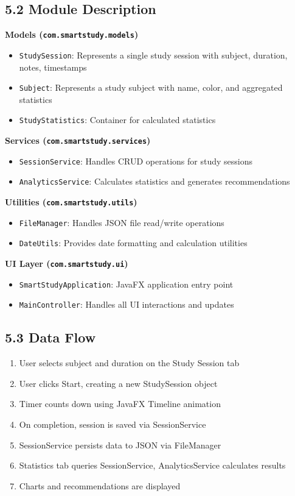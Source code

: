 \documentclass[12pt,a4paper]{article}
\begin{document}
\subsection{5.2 Module Description}

\textbf{Models (\texttt{com.smartstudy.models})}
\begin{itemize}
    \item \texttt{StudySession}: Represents a single study session with subject, duration, notes, timestamps
    \item \texttt{Subject}: Represents a study subject with name, color, and aggregated statistics
    \item \texttt{StudyStatistics}: Container for calculated statistics
\end{itemize}

\textbf{Services (\texttt{com.smartstudy.services})}
\begin{itemize}
    \item \texttt{SessionService}: Handles CRUD operations for study sessions
    \item \texttt{AnalyticsService}: Calculates statistics and generates recommendations
\end{itemize}

\textbf{Utilities (\texttt{com.smartstudy.utils})}
\begin{itemize}
    \item \texttt{FileManager}: Handles JSON file read/write operations
    \item \texttt{DateUtils}: Provides date formatting and calculation utilities
\end{itemize}

\textbf{UI Layer (\texttt{com.smartstudy.ui})}
\begin{itemize}
    \item \texttt{SmartStudyApplication}: JavaFX application entry point
    \item \texttt{MainController}: Handles all UI interactions and updates
\end{itemize}

\subsection{5.3 Data Flow}

\begin{enumerate}
    \item User selects subject and duration on the Study Session tab
    \item User clicks Start, creating a new StudySession object
    \item Timer counts down using JavaFX Timeline animation
    \item On completion, session is saved via SessionService
    \item SessionService persists data to JSON via FileManager
    \item Statistics tab queries SessionService, AnalyticsService calculates results
    \item Charts and recommendations are displayed
\end{enumerate}
\end{document}

